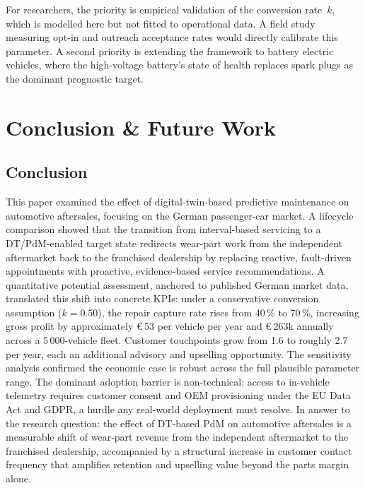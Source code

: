 \documentclass[conference,a4paper]{IEEEtran}
\begin{document}
For researchers, the priority is empirical validation of the conversion
rate~$k$, which is modelled here but not fitted to operational data. A field
study measuring opt-in and outreach acceptance rates would directly calibrate
this parameter. A second priority is extending the framework to battery electric
vehicles, where the high-voltage battery's state of health replaces spark plugs
as the dominant prognostic target.


\section{Conclusion \& Future Work}

\subsection{Conclusion}

This paper examined the effect of digital-twin-based predictive maintenance on
automotive aftersales, focusing on the German passenger-car market. A lifecycle
comparison showed that the transition from interval-based servicing to a
DT/PdM-enabled target state redirects wear-part work from the independent
aftermarket back to the franchised dealership by replacing reactive,
fault-driven appointments with proactive, evidence-based service recommendations.
A quantitative potential assessment, anchored to published German market data,
translated this shift into concrete KPIs: under a conservative conversion
assumption ($k = 0.50$), the repair capture rate rises from 40\,\% to 70\,\%,
increasing gross profit by approximately \euro\,53 per vehicle per year and
\euro\,263k annually across a 5\,000-vehicle fleet. Customer touchpoints grow
from 1.6 to roughly 2.7 per year, each an additional advisory and upselling
opportunity. The sensitivity analysis confirmed the economic case is robust
across the full plausible parameter range. The dominant adoption barrier is
non-technical: access to in-vehicle telemetry requires customer consent and OEM
provisioning under the EU Data Act and GDPR, a hurdle any real-world deployment
must resolve. In answer to the research question: the effect of DT-based PdM on
automotive aftersales is a measurable shift of wear-part revenue from the
independent aftermarket to the franchised dealership, accompanied by a structural
increase in customer contact frequency that amplifies retention and upselling value
beyond the parts margin alone.
\end{document}
